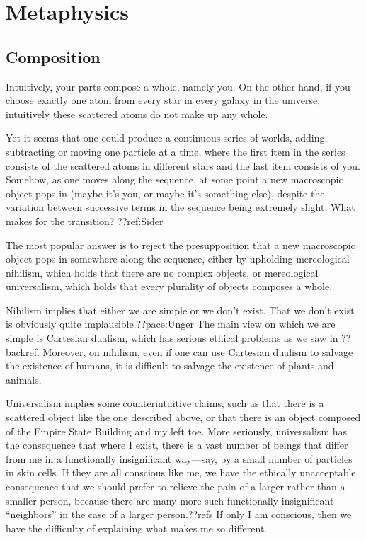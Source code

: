 \def\mychapter{IX}

\chapter{Metaphysics}\label{ch:metaphysics}
\section{Composition}
Intuitively, your parts compose a whole, namely you. On the other hand,
if you choose exactly one atom from every star in every galaxy in the universe,
intuitively these scattered atoms do not make up any whole.

Yet it seems that one could produce a continuous series of worlds, adding, subtracting or moving 
one particle at a time, where the first item in the series consists of the scattered
atoms in different stars and the last item consists of you. Somehow, as one moves
along the sequence, at some point a new macroscopic object pops in (maybe it's 
you, or maybe it's something else), despite the variation between successive terms
in the sequence being extremely slight. What makes for the transition? ??ref:Sider

The most popular answer is to reject the presupposition that a new macroscopic object
pops in somewhere along the sequence, either by upholding mereological nihilism, which holds that
there are no complex objects, or mereological universalism, which holds that every plurality of
objects composes a whole. 

Nihilism implies that either we are
simple or we don't exist. That we don't exist is obviously quite implausible.??pace:Unger 
The main view on which we are simple is Cartesian dualism, which has serious ethical problems 
as we saw in ??backref. Moreover, on nihilism, even if one can use Cartesian dualism to salvage
the existence of humans, it is difficult to salvage the existence of plants and animals.

Universalism implies some counterintuitive claims, such as that there is a scattered object
like the one described above, or that there is an object composed of the Empire State Building
and my left toe. More seriously, universalism has the consequence that where I exist, there
is a vast number of beings that differ from me in a functionally insignificant way---say, 
by a small number of particles in skin cells. If they are all conscious like me, we have the 
ethically unacceptable consequence that we should prefer to relieve the pain of a larger
rather than a smaller person, because there are many more such functionally insignificant 
``neighbors'' in the case of a larger person.??refs If only I am conscious, then we have the
difficulty of explaining what makes me so different.

